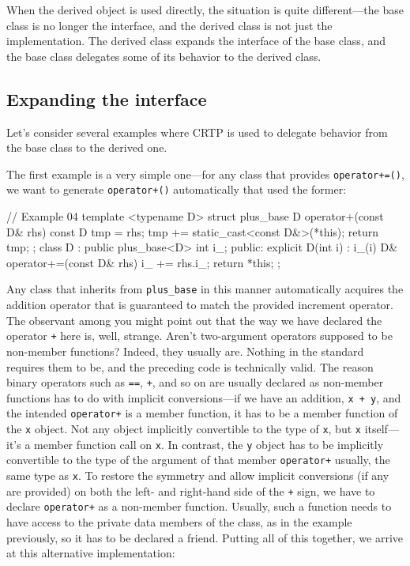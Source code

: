 When the derived object is used directly, the situation is quite different---the base class is no longer the interface, and the derived class is not just the implementation. The derived class expands the interface of the base class, and the base class delegates some of its behavior to the derived class.

\subsection{Expanding the interface}

Let's consider several examples where CRTP is used to delegate behavior from the base class to the derived one.

The first example is a very simple one---for any class that provides \texttt{operator+=()}, we want to generate \texttt{operator+()} automatically that used the former:

\begin{code}
// Example 04
template <typename D> struct plus_base {
  D operator+(const D& rhs) const {
    D tmp = rhs;
    tmp += static_cast<const D&>(*this);
    return tmp;
  }
};
class D : public plus_base<D> {
  int i_;
  public:
  explicit D(int i) : i_(i) {}
  D& operator+=(const D& rhs) {
    i_ += rhs.i_;
    return *this;
  }
};
\end{code}

Any class that inherits from \texttt{plus\_base} in this manner automatically acquires the addition operator that is guaranteed to match the provided increment operator. The observant among you might point out that the way we have declared the operator \texttt{+} here is, well, strange. Aren't two-argument operators supposed to be non-member functions? Indeed, they usually are. Nothing in the standard requires them to be, and the preceding code is technically valid. The reason binary operators such as \texttt{==}, \texttt{+}, and so on are usually declared as non-member functions has to do with implicit conversions---if we have an addition, \texttt{x\ +\ y}, and the intended \texttt{operator+} is a member function, it has to be a member function of the \texttt{x} object. Not any object implicitly convertible to the type of \texttt{x}, but \texttt{x} itself---it's a member function call on \texttt{x}. In contrast, the \texttt{y} object has to be implicitly convertible to the type of the argument of that member \texttt{operator+} usually, the same type as \texttt{x}. To restore the symmetry and allow implicit conversions (if any are provided) on both the left- and right-hand side of the \texttt{+} sign, we have to declare \texttt{operator+} as a non-member function. Usually, such a function needs to have access to the private data members of the class, as in the example previously, so it has to be declared a friend. Putting all of this together, we arrive at this alternative implementation:

